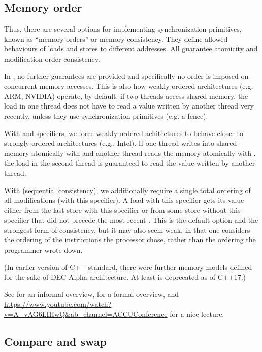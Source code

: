 \subsection{Memory order}

Thus, there are several options for implementing synchronization primitives, known as ``memory orders'' or memory consistency. They define allowed behaviours of loads and stores to different addresses.
All guarantee atomicity and modification-order consistency.

In , no further guarantees are provided and specifically no order is imposed on concurrent memory accesses. This is also how weakly-ordered architectures (e.g. ARM, NVIDIA) operate, by default: if two threads access shared memory, the load in one thread does not have to read a value written by another thread very recently, unless they use synchronization primitives (e.g. a fence).

With  and  specifiers, we force  weakly-ordered achitectures to behave closer to strongly-ordered architectures (e.g., Intel). If one thread writes into shared memory atomically with  and another thread reads the memory atomically with , the load in the second thread is guaranteed to read the value written by another thread. 

With  (sequential consistency), we additionally require a single total ordering of all modifications (with this specifier). A load with this specifier gets its value either from the last store with this specifier or from some store without this specifier that did not precede the most recent . This is the default option and the strongest form of consistency, but it may also seem weak, in that one considers the ordering of the instructions the processor chose, rather than the ordering the programmer wrote down. 

(In earlier version of C++ standard, there were further memory models defined for the sake of DEC Alpha architecture. At least  is deprecated as of C++17.) 

See \cite{Poter2018} for an informal overview, \cite{Alglave2012} for a formal overview, and \url{https://www.youtube.com/watch?v=A_vAG6LIHwQ&ab_channel=ACCUConference} for a nice lecture. 

\subsection{Compare and swap}

